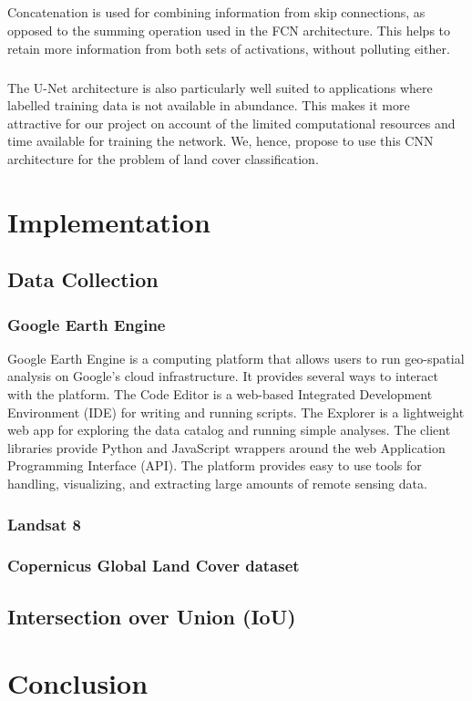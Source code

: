 \documentclass[12pt, a4paper]{report}
\begin{document}
\paragraph{}
Concatenation is used for combining information from skip connections, as opposed to the summing operation used in the FCN architecture. This helps to retain more information from both sets of activations, without polluting either.
\paragraph{}
The U-Net architecture is also particularly well suited to applications where labelled training data is not available in abundance. This makes it more attractive for our project on account of the limited computational resources and time available for training the network. We, hence, propose to use this CNN architecture for the problem of land cover classification.
\chapter{Implementation}
\section{Data Collection}
\subsection{Google Earth Engine}
Google Earth Engine is a computing platform that allows users to run geo-spatial analysis on Google's cloud infrastructure. It provides several ways to interact with the platform. The Code Editor is a web-based Integrated Development Environment (IDE) for writing and running scripts. The Explorer is a lightweight web app for exploring the data catalog and running simple analyses. The client libraries provide Python and JavaScript wrappers around the web Application Programming Interface (API). The platform provides easy to use tools for handling, visualizing, and extracting large amounts of remote sensing data.\cite{gee1}
\subsection{Landsat 8}

\subsection{Copernicus Global Land Cover dataset}
\section{Intersection over Union (IoU)}

\chapter{Conclusion}

\printbibliography[heading=bibintoc, title={References}]
\end{document}
